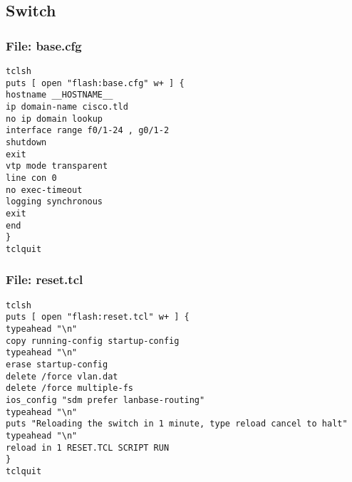 \documentclass{article}
\begin{document}

\subsection{Switch}


\subsubsection{File: base.cfg}

\begin{verbatim}
tclsh
puts [ open "flash:base.cfg" w+ ] {
hostname __HOSTNAME__
ip domain-name cisco.tld
no ip domain lookup
interface range f0/1-24 , g0/1-2
shutdown
exit
vtp mode transparent
line con 0
no exec-timeout
logging synchronous
exit
end
}
tclquit
\end{verbatim}


\subsubsection{File: reset.tcl}

\begin{verbatim}
tclsh
puts [ open "flash:reset.tcl" w+ ] {
typeahead "\n"
copy running-config startup-config
typeahead "\n"
erase startup-config
delete /force vlan.dat
delete /force multiple-fs
ios_config "sdm prefer lanbase-routing"
typeahead "\n"
puts "Reloading the switch in 1 minute, type reload cancel to halt"
typeahead "\n"
reload in 1 RESET.TCL SCRIPT RUN
}
tclquit
\end{verbatim}

%
%




%
%
\end{document}
